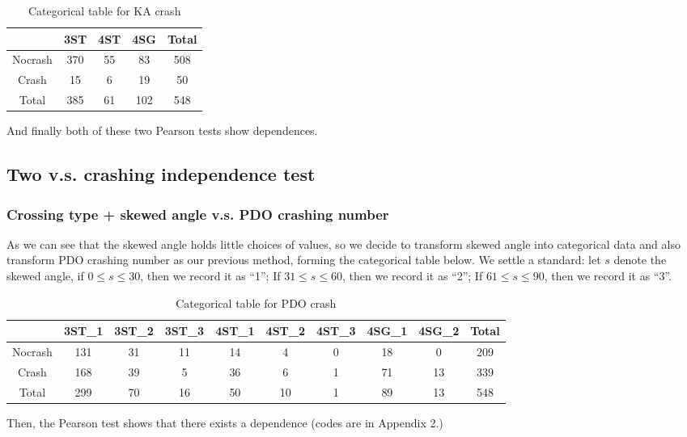 \documentclass[11pt]{scrartcl} %
\begin{document}
\begin{table}[H]
\caption{Categorical table for KA crash}
\centering
\begin{tabular}{|c|c|c|c|c|}
\hline
      & 3ST & 4ST & 4SG & Total \\
\hline
Nocrash & 370 & 55  & 83 & 508 \\
\hline
Crash    & 15  & 6  & 19  & 50 \\
\hline
Total    & 385  & 61  & 102  & 548 \\
\hline
\end{tabular}
\end{table}

And finally both of these two Pearson tests show dependences.


\subsection{Two v.s. crashing independence test}

\subsubsection{Crossing type + skewed angle v.s. PDO crashing number}

As we can see that the skewed angle holds little choices of values, so we decide to transform skewed angle into categorical data and also transform PDO crashing number as our previous method, forming the categorical table below. We settle a standard: let $s$ denote the skewed angle, if $0 \le s \le 30$, then we record it as ``1''; If $31 \le s \le 60$, then we record it as ``2''; If $61 \le s \le 90$, then we record it as ``3''.

\begin{table}[H]
\caption{Categorical table for PDO crash}
\centering
\begin{tabular}{|c|c|c|c|c|c|c|c|c|c|}
\hline
      & 3ST\_1 & 3ST\_2 & 3ST\_3 & 4ST\_1 & 4ST\_2 & 4ST\_3 & 4SG\_1 & 4SG\_2 & Total \\
\hline
Nocrash & 131 & 31  & 11 & 14 & 4 & 0 & 18 & 0 & 209\\
\hline
Crash    & 168  & 39  & 5  & 36 & 6 & 1 & 71 & 13 & 339\\
\hline
Total    & 299  & 70  & 16  & 50 & 10 & 1 & 89 & 13 & 548 \\
\hline
\end{tabular}
\end{table}

Then, the Pearson test shows that there exists a dependence (codes are in Appendix 2.)
\end{document}
